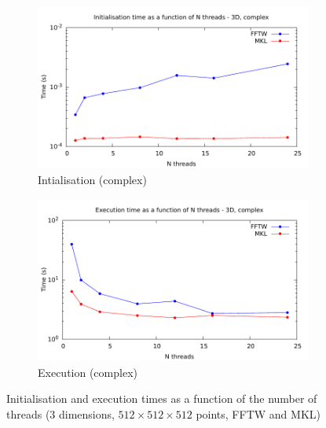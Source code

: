 \documentclass[12pt, a4paper]{article}
\begin{document}
\begin{figure}[H]
\begin{subfigure}{.5\textwidth}
\centering
\includegraphics[width=.9\linewidth]{graphs/3d-multh-init-c.pdf}
\caption{Intialisation (complex)}
\label{3DMULTHCI}
\end{subfigure}%
\begin{subfigure}{.5\textwidth}
\centering
\includegraphics[width=.9\linewidth]{graphs/3d-multh-exec-c.pdf}
\caption{Execution (complex)}
\label{3DMULTHCR}
\end{subfigure}
\caption{Initialisation and execution times as a function of the number of threads (3 dimensions, $512 \times 512\times 512$ points, FFTW and MKL)}
\label{3DMKLMPITHREAD}
\end{figure}
\end{document}
